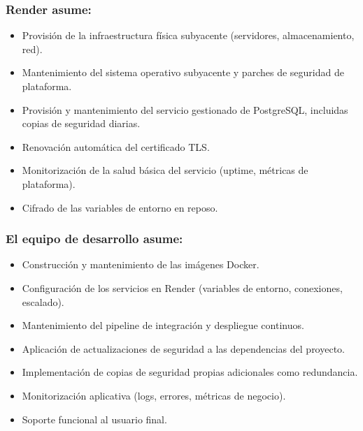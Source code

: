 \subsubsection*{Render asume:}
\begin{itemize}
    \item Provisión de la infraestructura física subyacente (servidores,
    almacenamiento, red).

    \item Mantenimiento del sistema operativo subyacente y parches de 
    seguridad de plataforma.

    \item Provisión y mantenimiento del servicio gestionado de PostgreSQL, 
    incluidas copias de seguridad diarias.

    \item Renovación automática del certificado TLS.\

    \item Monitorización de la salud básica del servicio (uptime, métricas de plataforma).

    \item Cifrado de las variables de entorno en reposo.
\end{itemize}


\subsubsection*{El equipo de desarrollo asume:}
\begin{itemize}
    \item Construcción y mantenimiento de las imágenes Docker.
    
    \item Configuración de los servicios en Render (variables de entorno,
    conexiones, escalado).

    \item Mantenimiento del pipeline de integración y despliegue continuos.
    
    \item Aplicación de actualizaciones de seguridad a las dependencias del proyecto.
    
    \item Implementación de copias de seguridad propias adicionales como redundancia.
    
    \item Monitorización aplicativa (logs, errores, métricas de negocio).
    
    \item Soporte funcional al usuario final.
\end{itemize}